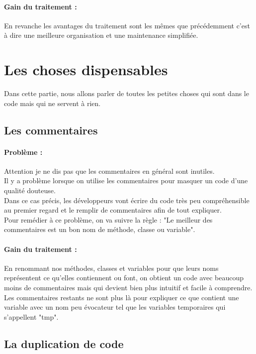 \documentclass[a4paper,twoside,12pt,openright]{report}
\begin{document}
\paragraph{Gain du traitement :}
En revanche les avantages du traitement sont les mêmes que précédemment c'est à dire une meilleure organisation et une maintenance simplifiée.\\

\newpage

\section{Les choses dispensables}
Dans cette partie, nous allons parler de toutes les petites choses qui sont dans le code mais qui ne servent à rien.

\subsection{Les commentaires}
\paragraph{Problème :}
Attention je ne dis pas que les commentaires en général sont inutiles.\\
Il y a problème lorsque on utilise les commentaires pour masquer un code d'une qualité douteuse.\\
Dans ce cas précis, les développeurs vont écrire du code très peu compréhensible au premier regard et le remplir de commentaires afin de tout expliquer.\\
Pour remédier à ce problème, on va suivre la règle : "Le meilleur des commentaires est un bon nom de méthode, classe ou variable".\\

\paragraph{Gain du traitement :}
En renommant nos méthodes, classes et variables pour que leurs noms représentent ce qu'elles contiennent ou font, on obtient un code avec beaucoup moins de commentaires mais qui devient bien plus intuitif et facile à comprendre.\\
Les commentaires restants ne sont plus là pour expliquer ce que contient une variable avec un nom peu évocateur tel que les variables temporaires qui s'appellent "tmp".\\

\subsection{La duplication de code}
\end{document}
